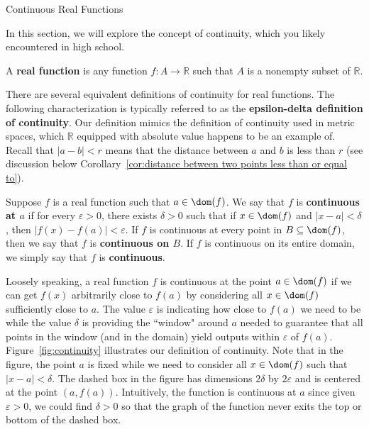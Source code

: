 \begin{section}{Continuous Real Functions}\label{sec:Continuity}

In this section, we will explore the concept of continuity, which you likely encountered in high school.

\begin{definition}
A \textbf{real function} is any function $f:A\to \mathbb{R}$ such that $A$ is a nonempty subset of $\mathbb{R}$. 
\end{definition}

There are several equivalent definitions of continuity for real functions.  The following characterization is typically referred to as the \textbf{epsilon-delta definition of continuity}. Our definition mimics the definition of continuity used in metric spaces, which $\mathbb{R}$ equipped with absolute value happens to be an example of.  Recall that $|a-b|<r$ means that the distance between $a$ and $b$ is less than $r$ (see discussion below Corollary~\ref{cor:distance between two points less than or equal to}).

\begin{definition}\label{def:continuity}
Suppose $f$ is a real function such that $a\in \dom(f)$. We say that $f$ is \textbf{continuous at $a$} if for every $\varepsilon>0$, there exists $\delta>0$ such that if $x\in\dom(f)$ and $|x-a|<\delta$, then $|f(x)-f(a)|<\varepsilon$. If $f$ is continuous at every point in $B\subseteq\dom(f)$, then we say that $f$ is \textbf{continuous on $B$}. If $f$ is continuous on its entire domain, we simply say that $f$ is \textbf{continuous}.
\end{definition}


Loosely speaking, a real function $f$ is continuous at the point $a\in\dom(f)$ if we can get $f(x)$ arbitrarily close to $f(a)$ by considering all $x\in\dom(f)$ sufficiently close to $a$.  The value $\varepsilon$ is indicating how close to $f(a)$ we need to be while the value $\delta$ is providing the ``window" around $a$ needed to guarantee that all points in the window (and in the domain) yield outputs within $\varepsilon$ of $f(a)$. Figure~\ref{fig:continuity} illustrates our definition of continuity. Note that in the figure, the point $a$ is fixed while we need to consider all $x\in\dom(f)$ such that $|x-a|<\delta$. The dashed box in the figure has dimensions $2\delta$ by $2\varepsilon$ and is centered at the point $(a,f(a))$.  Intuitively, the function is continuous at $a$ since given $\varepsilon>0$, we could find $\delta >0$ so that the graph of the function never exits the top or bottom of the dashed box.


\end{section}
